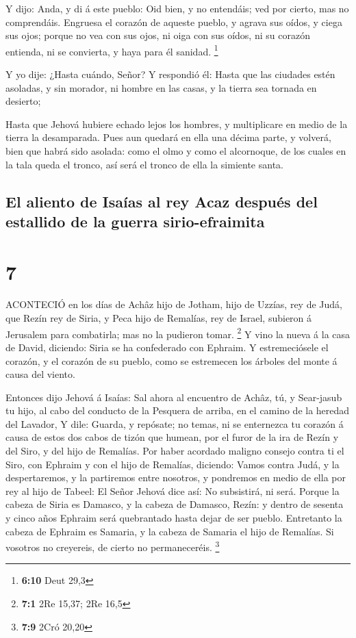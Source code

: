  Y dijo: Anda, y di á este pueblo: Oid bien, y no entendáis;
ved por cierto, mas no comprendáis.  Engruesa el corazón de
aqueste pueblo, y agrava sus oídos, y ciega sus ojos; porque no vea con
sus ojos, ni oiga con sus oídos, ni su corazón entienda, ni se
convierta, y haya para él sanidad. \footnote{\textbf{6:10} Deut 29,3}

 Y yo dije: ¿Hasta cuándo, Señor? Y respondió él: Hasta que
las ciudades estén asoladas, y sin morador, ni hombre en las casas, y la
tierra sea tornada en desierto;

 Hasta que Jehová hubiere echado lejos los hombres, y
multiplicare en medio de la tierra la desamparada.  Pues
aun quedará en ella una décima parte, y volverá, bien que habrá sido
asolada: como el olmo y como el alcornoque, de los cuales en la tala
queda el tronco, así será el tronco de ella la simiente santa.

\hypertarget{el-aliento-de-isauxedas-al-rey-acaz-despuuxe9s-del-estallido-de-la-guerra-sirio-efraimita}{%
\subsection{El aliento de Isaías al rey Acaz después del estallido de la
guerra
sirio-efraimita}\label{el-aliento-de-isauxedas-al-rey-acaz-despuuxe9s-del-estallido-de-la-guerra-sirio-efraimita}}

\hypertarget{section-6}{%
\section{7}\label{section-6}}

 ACONTECIÓ en los días de Achâz hijo de Jotham, hijo de
Uzzías, rey de Judá, que Rezín rey de Siria, y Peca hijo de Remalías,
rey de Israel, subieron á Jerusalem para combatirla; mas no la pudieron
tomar. \footnote{\textbf{7:1} 2Re 15,37; 2Re 16,5}  Y vino
la nueva á la casa de David, diciendo: Siria se ha confederado con
Ephraim. Y estremeciósele el corazón, y el corazón de su pueblo, como se
estremecen los árboles del monte á causa del viento.

 Entonces dijo Jehová á Isaías: Sal ahora al encuentro de
Achâz, tú, y Sear-jasub tu hijo, al cabo del conducto de la Pesquera de
arriba, en el camino de la heredad del Lavador,  Y dile:
Guarda, y repósate; no temas, ni se enternezca tu corazón á causa de
estos dos cabos de tizón que humean, por el furor de la ira de Rezín y
del Siro, y del hijo de Remalías.  Por haber acordado
maligno consejo contra ti el Siro, con Ephraim y con el hijo de
Remalías, diciendo:  Vamos contra Judá, y la despertaremos,
y la partiremos entre nosotros, y pondremos en medio de ella por rey al
hijo de Tabeel:  El Señor Jehová dice así: No subsistirá, ni
será.  Porque la cabeza de Siria es Damasco, y la cabeza de
Damasco, Rezín: y dentro de sesenta y cinco años Ephraim será
quebrantado hasta dejar de ser pueblo.  Entretanto la cabeza
de Ephraim es Samaria, y la cabeza de Samaria el hijo de Remalías. Si
vosotros no creyereis, de cierto no permaneceréis. \footnote{\textbf{7:9}
  2Cró 20,20}


